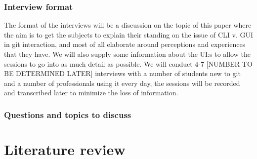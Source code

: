 \documentclass[12pt,a4paper,article,compsoc]{IEEEtran}
\begin{document}
				\subsubsection*{Interview format}
				The format of the interviews will be a discussion on the topic of this paper where the aim is to get the subjects to explain their standing on the issue of CLI v. GUI in git interaction, and most of all elaborate around perceptions and experiences that they have. We will also supply some information about the UI:s to allow the sessions to go into as much detail as possible. 
				We will conduct 4-7 [NUMBER TO BE DETERMINED LATER] interviews with a number of students new to git and a number of professionals using it every day, the sessions will be recorded and transcribed later to minimize the loss of information.
					
				\subsubsection*{Questions and topics to discuss}
		
		\section{Literature review}
		
\end{document}
